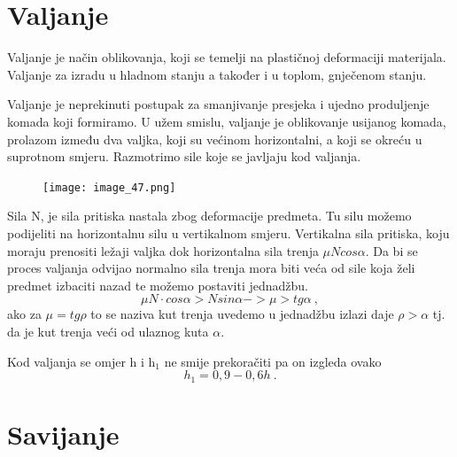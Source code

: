 \documentclass[a4paper,12pt]{article}
\numberwithin{figure}{section}
\begin{document}
\section{Valjanje}
Valjanje je način oblikovanja, koji se temelji na plastičnoj deformaciji materijala. Valjanje za izradu u hladnom stanju a također i  u toplom, gnječenom stanju.\par
Valjanje je neprekinuti postupak za smanjivanje presjeka i ujedno produljenje komada koji formiramo. U užem smislu, valjanje je oblikovanje usijanog komada, prolazom između dva valjka, koji su većinom horizontalni, a koji se okreću u suprotnom smjeru. Razmotrimo sile koje se javljaju kod valjanja.\par
\begin{figure}[!h]
\centering
\texttt{[image: image\_47.png]}
\end{figure}
\FloatBarrier
Sila N, je sila pritiska nastala zbog deformacije predmeta. Tu silu možemo podijeliti na horizontalnu silu u vertikalnom smjeru. Vertikalna sila pritiska, koju moraju prenositi ležaji valjka dok horizontalna sila trenja $\mu N cos \alpha$. Da bi se proces valjanja odvijao normalno sila trenja mora biti veća od sile koja želi predmet izbaciti nazad te možemo postaviti jednadžbu.
\begin{equation}
\mu N\cdot cos \alpha > N sin \alpha -> \mu > tg \alpha\:,
\end{equation} 
ako za $\mu = tg\rho$ to se naziva kut trenja uvedemo u jednadžbu izlazi daje $\rho>\alpha$ tj. da je kut trenja veći od ulaznog kuta $\alpha$.\par
Kod valjanja se omjer h i h$_{1}$ ne smije prekoračiti pa on izgleda ovako
\begin{equation}
h_{1}=0,9 - 0,6 h\:.
\end{equation}
\clearpage
\section{Savijanje}
\end{document}
